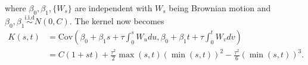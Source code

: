 \documentclass{scrartcl}
\begin{document}
\begin{enumerate}
  where $\beta_0, \beta_1, \{W_s\}$ are independent with $W_s$ being
  Brownian motion and $\beta_0, \beta_1 \overset{\text{i.i.d}}{\sim} N(0,
  C)$. The kernel now becomes
  \begin{align*}
    K(s, t) &= \text{Cov} \left(\beta_0 + \beta_1 s + \tau \int_0^s W_u du,
      \beta_0 + \beta_1 t + \tau \int_0^t W_v dv \right) \\ &= C (1 +
                                                              st) +
                                                              \frac{\tau^2}{2}
                                                              \max(s,
                                                              t)
                                                              \left(\min(s,
                                                              t)\right)^2
                                                              - 
    \frac{\tau^2}{6} \left(\min(s, t) \right)^3. 
  \end{align*}
\end{enumerate}




  


  
 
\end{document}

